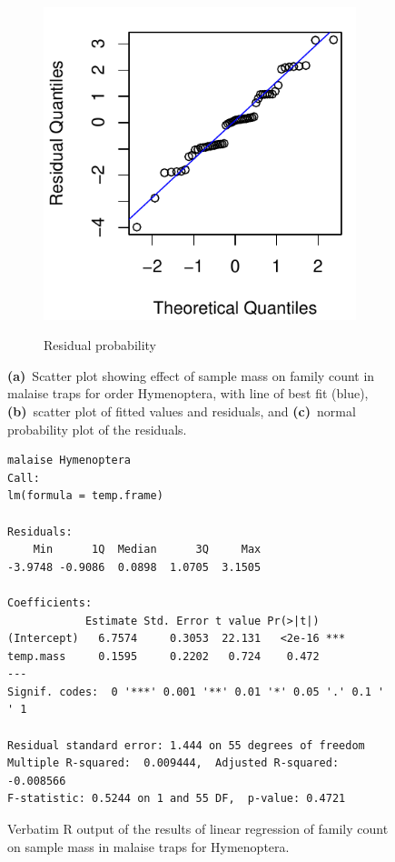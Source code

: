 \documentclass[10pt,letterpaper,twocolumn]{article}
\begin{document}
\begin{figure}[h]
\begin{subfigure}[b]{0.15\textwidth}
		\label{fig:malaise_hymenoptera_resid}
	\end{subfigure}
	~
	\begin{subfigure}[b]{0.15\textwidth}
		\caption{Residual probability}
		\includegraphics[width=\textwidth]{plots/mass-vs-count/qqplot/2015_malaise_Hymenoptera_qqplot.pdf}
		\label{fig:malaise_hymenoptera_qqplot}
	\end{subfigure}
	\caption{\textbf{(a)}~Scatter plot showing effect of sample mass on family count in malaise traps for order Hymenoptera, with line of best fit (blue), \textbf{(b)}~scatter plot of fitted values and residuals, and \textbf{(c)}~normal probability plot of the residuals.}
	\label{fig:malaise_hymenoptera}
	\smallskip
	\nointerlineskip
	\hrulefill
\end{figure}

\begin{figure}[h]
	\lstset{numbers=left}
	\lstset{xleftmargin=5mm,framexleftmargin=5mm}
	\begin{lstlisting}
malaise Hymenoptera
Call:
lm(formula = temp.frame)

Residuals:
    Min      1Q  Median      3Q     Max 
-3.9748 -0.9086  0.0898  1.0705  3.1505 

Coefficients:
            Estimate Std. Error t value Pr(>|t|)    
(Intercept)   6.7574     0.3053  22.131   <2e-16 ***
temp.mass     0.1595     0.2202   0.724    0.472    
---
Signif. codes:  0 '***' 0.001 '**' 0.01 '*' 0.05 '.' 0.1 ' ' 1

Residual standard error: 1.444 on 55 degrees of freedom
Multiple R-squared:  0.009444,	Adjusted R-squared:  -0.008566 
F-statistic: 0.5244 on 1 and 55 DF,  p-value: 0.4721
	\end{lstlisting}
	\caption{Verbatim R output of the results of linear regression of family count on sample mass in malaise traps for Hymenoptera.}
	\label{fig:malaise_hymenoptera_regression}
	\smallskip
	\nointerlineskip
	\hrulefill
\end{figure}
\end{document}
